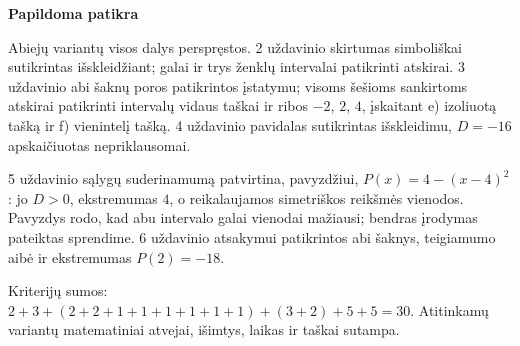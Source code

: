 \documentclass[11pt]{article}
\newcommand{\sk}[1]{\par\medskip\textbf{#1}\par}
\begin{document}
\sk{Papildoma patikra}
Abiejų variantų visos dalys perspręstos. 2 uždavinio skirtumas simboliškai sutikrintas išskleidžiant; galai ir trys ženklų intervalai patikrinti atskirai. 3 uždavinio abi šaknų poros patikrintos įstatymu; visoms šešioms sankirtoms atskirai patikrinti intervalų vidaus taškai ir ribos $-2$, $2$, $4$, įskaitant e) izoliuotą tašką ir f) vienintelį tašką. 4 uždavinio pavidalas sutikrintas išskleidimu, $D=-16$ apskaičiuotas nepriklausomai.

5 uždavinio sąlygų suderinamumą patvirtina, pavyzdžiui, $P(x)=4-(x-4)^2$: jo $D>0$, ekstremumas $4$, o reikalaujamos simetriškos reikšmės vienodos. Pavyzdys rodo, kad abu intervalo galai vienodai mažiausi; bendras įrodymas pateiktas sprendime. 6 uždavinio atsakymui patikrintos abi šaknys, teigiamumo aibė ir ekstremumas $P(2)=-18$.

Kriterijų sumos: $2+3+(2+2+1+1+1+1+1+1)+(3+2)+5+5=30$. Atitinkamų variantų matematiniai atvejai, išimtys, laikas ir taškai sutampa.
\end{document}
